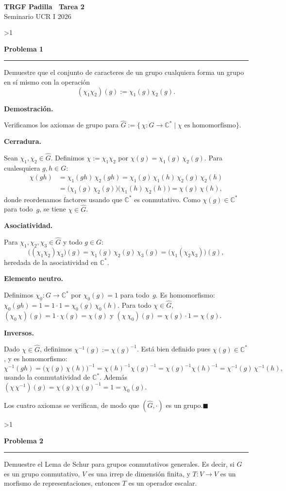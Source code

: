 \documentclass[10pt,a4paper]{article}
\newcommand{\CC}{\mathbb{C}}
\newcommand{\inlinehead}[2][repblue]{%
  \par\smallskip
  {\color{#1}\bfseries #2.}\hspace{0.45em}%
}
\newcommand{\topbanner}{%
  \begin{tcolorbox}[
    colback=replight,
    colframe=repline,
    borderline west={1.2pt}{0pt}{repblue},
    borderline east={1.2pt}{0pt}{repteal},
    left=1.0em,
    right=1.0em,
    top=0.7em,
    bottom=0.55em
  ]
    {\Large\bfseries\color{repblue} TRGF Padilla \textemdash\ Tarea 2}\\[-0.1em]
    {\normalsize\color{repteal} Seminario UCR I 2026}
  \end{tcolorbox}
}
\newcounter{probcnt}
\newcommand{\problem}[2]{%
  \stepcounter{probcnt}%
  \ifnum\value{probcnt}>1\newpage\fi
  \par\vspace{0.25em}
  {\large\bfseries\color{repblue} Problema #1}\par
  {\color{repline}\rule{\linewidth}{0.55pt}}\par
  \begin{tcolorbox}[
    breakable,
    colback=white,
    colframe=repline,
    borderline west={1.6pt}{0pt}{repteal},
    left=0.7em,
    right=0.7em,
    top=0.35em,
    bottom=0.3em,
    before skip=0.35em,
    after skip=0.45em
  ]
    #2
  \end{tcolorbox}
}
\begin{document}
\color{black}
\topbanner
\small

\problem{1}{%
Demuestre que el conjunto de caracteres de un grupo cualquiera forma un grupo
en sí mismo con la operación
\[
  (\chi_1\chi_2)(g) := \chi_1(g)\chi_2(g).
\]
}

\inlinehead{Demostración}
Verificamos los axiomas de grupo para $\widehat{G}:=\{\,\chi\colon G\to\CC^{*}\mid\chi\text{ es homomorfismo}\}$.

\inlinehead[repteal]{Cerradura}
Sean $\chi_1,\chi_2\in\widehat{G}$. Definimos $\chi:=\chi_1\chi_2$ por
$\chi(g)=\chi_1(g)\,\chi_2(g)$. Para cualesquiera $g,h\in G$:
\begin{align*}
  \chi(gh)
    &= \chi_1(gh)\,\chi_2(gh)
     = \chi_1(g)\,\chi_1(h)\,\chi_2(g)\,\chi_2(h) \\
    &= \bigl(\chi_1(g)\,\chi_2(g)\bigr)\bigl(\chi_1(h)\,\chi_2(h)\bigr)
     = \chi(g)\,\chi(h),
\end{align*}
donde reordenamos factores usando que $\CC^{*}$ es conmutativo. Como
$\chi(g)\in\CC^{*}$ para todo~$g$, se tiene $\chi\in\widehat{G}$.

\inlinehead[repteal]{Asociatividad}
Para $\chi_1,\chi_2,\chi_3\in\widehat{G}$ y todo $g\in G$:
\[
  \bigl((\chi_1\chi_2)\chi_3\bigr)(g)
    = \chi_1(g)\,\chi_2(g)\,\chi_3(g)
    = \bigl(\chi_1(\chi_2\chi_3)\bigr)(g),
\]
heredada de la asociatividad en $\CC^{*}$.

\inlinehead[repteal]{Elemento neutro}
Definimos $\chi_0\colon G\to\CC^{*}$ por $\chi_0(g)=1$ para todo~$g$.
Es homomorfismo: $\chi_0(gh)=1=1\cdot 1=\chi_0(g)\,\chi_0(h)$.
Para todo $\chi\in\widehat{G}$,
$(\chi_0\,\chi)(g)=1\cdot\chi(g)=\chi(g)$ y
$(\chi\,\chi_0)(g)=\chi(g)\cdot 1=\chi(g)$.

\inlinehead[repteal]{Inversos}
Dado $\chi\in\widehat{G}$, definimos $\chi^{-1}(g):=\chi(g)^{-1}$.
Está bien definido pues $\chi(g)\in\CC^{*}$, y es homomorfismo:
\[
  \chi^{-1}(gh)
    = \bigl(\chi(g)\,\chi(h)\bigr)^{-1}
    = \chi(h)^{-1}\chi(g)^{-1}
    = \chi(g)^{-1}\chi(h)^{-1}
    = \chi^{-1}(g)\,\chi^{-1}(h),
\]
usando la conmutatividad de $\CC^{*}$. Además
$(\chi\,\chi^{-1})(g)=\chi(g)\chi(g)^{-1}=1=\chi_0(g)$.

\smallskip
Los cuatro axiomas se verifican, de modo que $(\widehat{G},\cdot)$ es un
grupo.\hfill$\blacksquare$

\problem{2}{%
Demuestre el Lema de Schur para grupos conmutativos generales. Es decir, si
$G$ es un grupo conmutativo, $V$ es una irrep de dimensión finita, y
$T \colon V \to V$ es un morfismo de representaciones, entonces $T$ es un
operador escalar.
}
\end{document}
